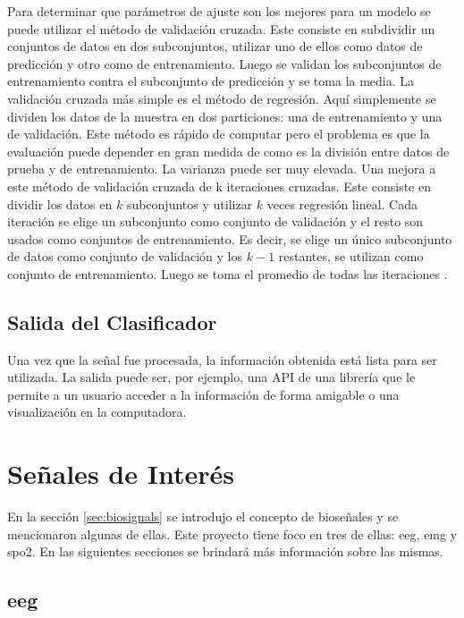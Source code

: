 Para determinar que parámetros de ajuste son los mejores para un modelo se puede utilizar el método de validación cruzada. Este consiste en subdividir un conjuntos de datos en dos subconjuntos, utilizar uno de ellos como datos de predicción y otro como de entrenamiento. Luego se validan los subconjuntos de entrenamiento contra el subconjunto de predicción y se toma la media. La validación cruzada más simple es el método de regresión. Aquí simplemente se dividen los datos de la muestra en dos particiones: una de entrenamiento y una de validación. Este método es rápido de computar pero el problema es que la evaluación puede depender en gran medida de como es la división entre datos de prueba y de entrenamiento. La varianza puede ser muy elevada. Una mejora a este método de validación cruzada de k iteraciones cruzadas. Este consiste en dividir los datos en $k$ subconjuntos y utilizar   $k$ veces regresión lineal. Cada iteración se elige un subconjunto como conjunto de validación y el resto son usados como conjuntos de entrenamiento. Es decir, se elige un único subconjunto de datos como conjunto de validación y los $k -1$ restantes, se utilizan como conjunto de entrenamiento. Luego se toma el promedio de todas las iteraciones \cite{cross-validation}.

\subsection{Salida del Clasificador}

Una vez que la señal fue procesada, la información obtenida está lista para ser utilizada. La salida puede ser, por ejemplo, una API de una librería que le permite a un usuario acceder a la información de forma amigable o una visualización en la computadora.

\section{Señales de Interés}

En la sección \ref{sec:biosignals} se introdujo el concepto de bioseñales y se mencionaron algunas de ellas. Este proyecto tiene foco en tres de ellas: 
\gls{eeg}, \gls{emg} y \gls{spo2}. En las siguientes secciones se brindará más información sobre las mismas.

\subsection{\gls{eeg}}

